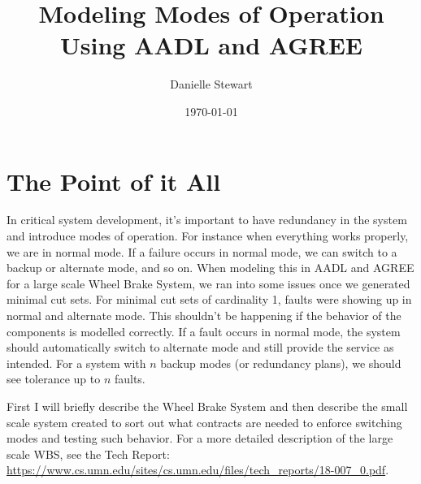 \documentclass{article}
\title{Modeling Modes of Operation \\ Using AADL and AGREE } %
\author{Danielle Stewart} %
\date{\today} %
\begin{document}
\maketitle %





\section{The Point of it All}

In critical system development, it's important to have redundancy in the system and introduce modes of operation. For instance when everything works properly, we are in normal mode. If a failure occurs in normal mode, we can switch to a backup or alternate mode, and so on. When modeling this in AADL and AGREE for a large scale Wheel Brake System, we ran into some issues once we generated minimal cut sets. For minimal cut sets of cardinality 1, faults were showing up in normal and alternate mode. This shouldn't be happening if the behavior of the components is modelled correctly. If a fault occurs in normal mode, the system should automatically switch to alternate mode and still provide the service as intended. For a system with $n$ backup modes (or redundancy plans), we should see tolerance up to $n$ faults.

First I will briefly describe the Wheel Brake System and then describe the small scale system created to sort out what contracts are needed to enforce switching modes and testing such behavior. For a more detailed description of the large scale WBS, see the Tech Report: \url{https://www.cs.umn.edu/sites/cs.umn.edu/files/tech_reports/18-007_0.pdf}.
 
\end{document}
